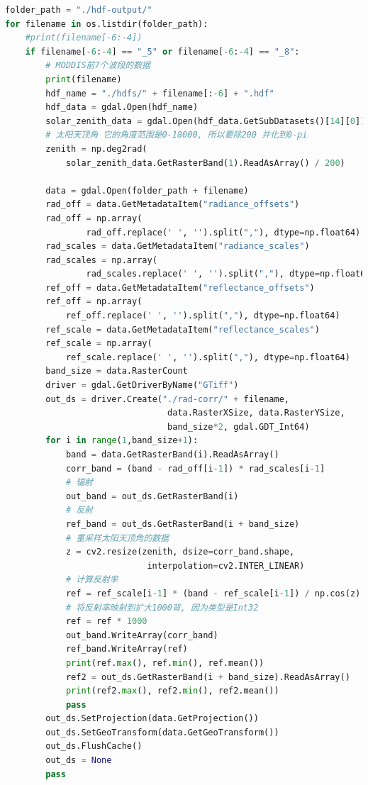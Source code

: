 \documentclass{ctexart}
\begin{document}
\begin{sloppypar}
\begin{appendices}
\begin{lstlisting}[frame=single, language=Python,  basicstyle={\ttfamily}, caption={辐射校正}, label=coderad_corr]
folder_path = "./hdf-output/"
for filename in os.listdir(folder_path):
    #print(filename[-6:-4])
    if filename[-6:-4] == "_5" or filename[-6:-4] == "_8": 
        # MODDIS前7个波段的数据
        print(filename)
        hdf_name = "./hdfs/" + filename[:-6] + ".hdf"
        hdf_data = gdal.Open(hdf_name)
        solar_zenith_data = gdal.Open(hdf_data.GetSubDatasets()[14][0])
        # 太阳天顶角 它的角度范围是0-18000, 所以要除200 并化到0-pi
        zenith = np.deg2rad(
            solar_zenith_data.GetRasterBand(1).ReadAsArray() / 200)

        data = gdal.Open(folder_path + filename)
        rad_off = data.GetMetadataItem("radiance_offsets")
        rad_off = np.array(
                rad_off.replace(' ', '').split(","), dtype=np.float64)
        rad_scales = data.GetMetadataItem("radiance_scales")
        rad_scales = np.array(
                rad_scales.replace(' ', '').split(","), dtype=np.float64)
        ref_off = data.GetMetadataItem("reflectance_offsets")
        ref_off = np.array(
            ref_off.replace(' ', '').split(","), dtype=np.float64)
        ref_scale = data.GetMetadataItem("reflectance_scales")
        ref_scale = np.array(
            ref_scale.replace(' ', '').split(","), dtype=np.float64)
        band_size = data.RasterCount
        driver = gdal.GetDriverByName("GTiff")
        out_ds = driver.Create("./rad-corr/" + filename, 
                                data.RasterXSize, data.RasterYSize,
                                band_size*2, gdal.GDT_Int64)
        for i in range(1,band_size+1):
            band = data.GetRasterBand(i).ReadAsArray()
            corr_band = (band - rad_off[i-1]) * rad_scales[i-1]
            # 辐射
            out_band = out_ds.GetRasterBand(i)
            # 反射
            ref_band = out_ds.GetRasterBand(i + band_size)
            # 重采样太阳天顶角的数据
            z = cv2.resize(zenith, dsize=corr_band.shape,
                            interpolation=cv2.INTER_LINEAR)
            # 计算反射率
            ref = ref_scale[i-1] * (band - ref_scale[i-1]) / np.cos(z).T
            # 将反射率映射到扩大1000背, 因为类型是Int32
            ref = ref * 1000
            out_band.WriteArray(corr_band)
            ref_band.WriteArray(ref)
            print(ref.max(), ref.min(), ref.mean())
            ref2 = out_ds.GetRasterBand(i + band_size).ReadAsArray()
            print(ref2.max(), ref2.min(), ref2.mean())
            pass
        out_ds.SetProjection(data.GetProjection())
        out_ds.SetGeoTransform(data.GetGeoTransform())
        out_ds.FlushCache()
        out_ds = None
        pass
\end{lstlisting}

\end{appendices}
\end{sloppypar}
\end{document}
